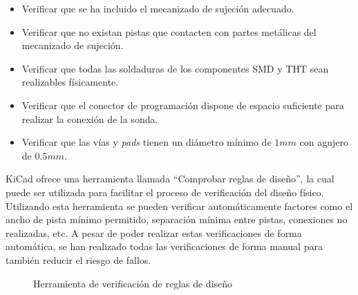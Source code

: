 \begin{itemize}
    \item Verificar que se ha incluido el mecanizado de sujeción adecuado.
    
    \item Verificar que no existan pistas que contacten con partes metálicas del mecanizado de sujeción.
    
    \item Verificar que todas las soldaduras de los componentes \ac{SMD} y \ac{THT} sean realizables físicamente.
    
    \item Verificar que el conector de programación dispone de espacio suficiente para realizar la conexión de la sonda.
    
    \item Verificar que las vías y \textit{pads} tienen un diámetro mínimo de $1mm$ con agujero de $0.5mm$.
    
\end{itemize}

KiCad ofrece una herramienta llamada ``Comprobar reglas de diseño'', la cual puede ser utilizada para facilitar el proceso de verificación del diseño físico. Utilizando esta herramienta se pueden verificar automáticamente factores como el ancho de pista mínimo permitido, separación mínima entre pistas, conexiones no realizadas, etc. A pesar de poder realizar estas verificaciones de forma automática, se han realizado todas las verificaciones de forma manual para también reducir el riesgo de fallos.

\begin{figure}[htbp]
\centering
{}
\caption{Herramienta de verificación de reglas de diseño} \label{fig:lego}
\end{figure}

